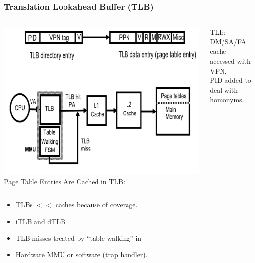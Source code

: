 \documentclass{beamer}
\begin{document}
\begin{frame}[fragile,t]
\frametitle{Translation Lookahead Buffer (TLB)}

\begin{columns}
\includegraphics[width=40ex]{Figures/FigsMemH/TLB}
Page Table Entries Are Cached in TLB:\\\smallskip
\begin{scriptsize}
TLB: DM/SA/FA cache accessed with VPN,\\
PID added to deal with homonyms.
\end{scriptsize}
\end{columns}

\begin{itemize}
\item TLBs $<<$ caches because of coverage.
\item iTLB and dTLB
\item TLB misses treated by ``table walking'' in 
\item Hardware MMU or software (trap handler).
\end{itemize}\bigskip

\end{frame}
\end{document}
